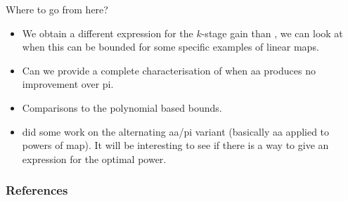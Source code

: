 \documentclass[aspectratio=169]{beamer}
\begin{document}
\begin{frame}{Where to go from here?}

    \begin{itemize}
        \item We obtain a different expression for the $k$-stage gain than
            \cite{Evans2020}, we can look at when this can be bounded for some specific
            examples of linear maps.
        \item Can we provide a complete characterisation of when \gls{aa} produces no
            improvement over \gls{pi}.
        \item Comparisons to the polynomial based bounds.
        \item \cite{Feng2024a} did some work on the alternating \gls{aa}/\gls{pi}
            variant (basically \gls{aa} applied to powers of map). It will be
            interesting to see if there is a way to give an expression for the optimal
            power.
    \end{itemize}


\end{frame}

\appendix

\begin{frame}[shrink=35]
  \frametitle{References}

  \tiny
  \printbibliography

\end{frame}

\printappxnotes
\end{document}
